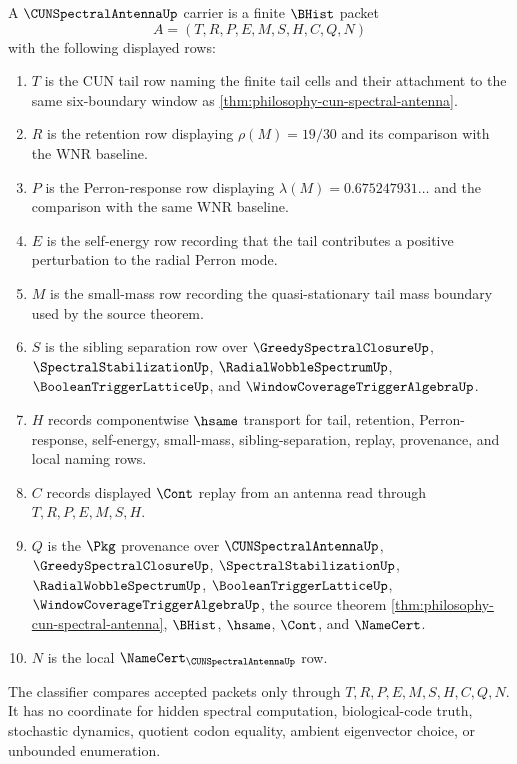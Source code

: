 \begin{definition}
\label{def:cun-spectral-antenna-carrier}
A $\CUNSpectralAntennaUp$ carrier is a finite $\BHist$ packet
$$
A=(T,R,P,E,M,S,H,C,Q,N)
$$
with the following displayed rows:
\begin{enumerate}
\item $T$ is the CUN tail row naming the finite tail cells and their attachment to the same six-boundary window as \autoref{thm:philosophy-cun-spectral-antenna}.
\item $R$ is the retention row displaying $\rho(M)=19/30$ and its comparison with the WNR baseline.
\item $P$ is the Perron-response row displaying $\lambda(M)=0.675247931\ldots$ and the comparison with the same WNR baseline.
\item $E$ is the self-energy row recording that the tail contributes a positive perturbation to the radial Perron mode.
\item $M$ is the small-mass row recording the quasi-stationary tail mass boundary used by the source theorem.
\item $S$ is the sibling separation row over $\GreedySpectralClosureUp$, $\SpectralStabilizationUp$, $\RadialWobbleSpectrumUp$, $\BooleanTriggerLatticeUp$, and $\WindowCoverageTriggerAlgebraUp$.
\item $H$ records componentwise $\hsame$ transport for tail, retention, Perron-response, self-energy, small-mass, sibling-separation, replay, provenance, and local naming rows.
\item $C$ records displayed $\Cont$ replay from an antenna read through $T,R,P,E,M,S,H$.
\item $Q$ is the $\Pkg$ provenance over $\CUNSpectralAntennaUp$, $\GreedySpectralClosureUp$, $\SpectralStabilizationUp$, $\RadialWobbleSpectrumUp$, $\BooleanTriggerLatticeUp$, $\WindowCoverageTriggerAlgebraUp$, the source theorem \autoref{thm:philosophy-cun-spectral-antenna}, $\BHist$, $\hsame$, $\Cont$, and $\NameCert$.
\item $N$ is the local $\NameCert_{\CUNSpectralAntennaUp}$ row.
\end{enumerate}
The classifier compares accepted packets only through $T,R,P,E,M,S,H,C,Q,N$. It has no coordinate for hidden spectral computation, biological-code truth, stochastic dynamics, quotient codon equality, ambient eigenvector choice, or unbounded enumeration.
\end{definition}

